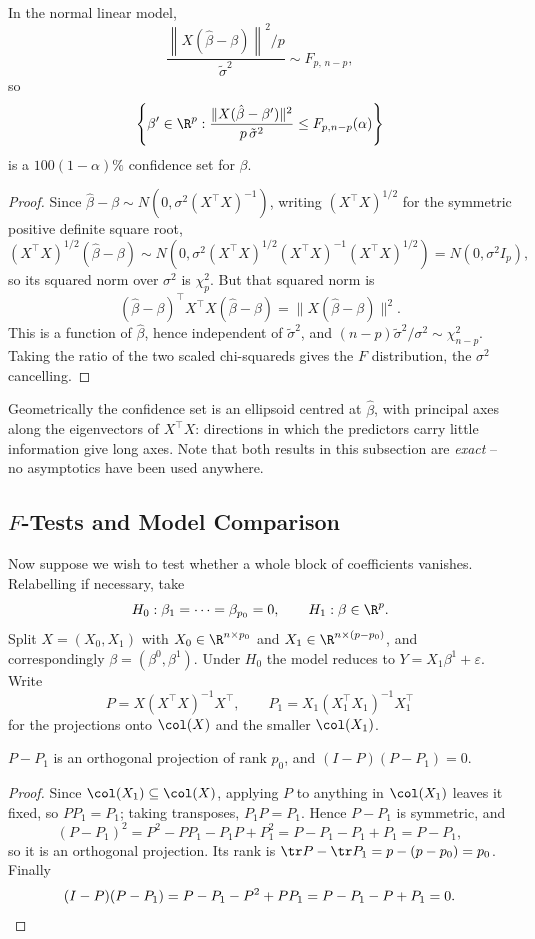 \begin{proposition}
  In the normal linear model,
  $$
  \frac{\left\|X(\hat\beta - \beta)\right\|^2/p}{\tilde\sigma^2}\sim F_{p,\,n-p},
  $$
  so
  $$
  \left\{\beta'\in\R^p : \frac{\|X(\hat\beta - \beta')\|^2}{p\,\tilde\sigma^2}\leq F_{p,n-p}(\alpha)\right\}
  $$
  is a $100(1-\alpha)\%$ confidence set for $\beta$.
\end{proposition}
\begin{proof}
  Since $\hat\beta - \beta\sim N(0,\sigma^2(X^\top X)^{-1})$, writing $(X^\top X)^{1/2}$ for the symmetric positive definite square root,
  $$
  (X^\top X)^{1/2}(\hat\beta - \beta)\sim N\left(0,\sigma^2(X^\top X)^{1/2}(X^\top X)^{-1}(X^\top X)^{1/2}\right) = N(0,\sigma^2 I_p),
  $$
  so its squared norm over $\sigma^2$ is $\chi^2_p$. But that squared norm is
  $$
  (\hat\beta-\beta)^\top X^\top X(\hat\beta-\beta) = \|X(\hat\beta-\beta)\|^2.
  $$
  This is a function of $\hat\beta$, hence independent of $\tilde\sigma^2$, and $(n-p)\tilde\sigma^2/\sigma^2\sim\chi^2_{n-p}$. Taking the ratio of the two scaled chi-squareds gives the $F$ distribution, the $\sigma^2$ cancelling.
\end{proof}

Geometrically the confidence set is an ellipsoid centred at $\hat\beta$, with principal axes along the eigenvectors of $X^\top X$: directions in which the predictors carry little information give long axes. Note that both results in this subsection are \emph{exact} -- no asymptotics have been used anywhere.

\subsection{\texorpdfstring{$F$}{F}-Tests and Model Comparison}

Now suppose we wish to test whether a whole block of coefficients vanishes. Relabelling if necessary, take
$$
H_0 : \beta_1 = \cdots = \beta_{p_0} = 0, \qquad H_1 : \beta\in\R^p.
$$
Split $X = (X_0, X_1)$ with $X_0\in\R^{n\times p_0}$ and $X_1 \in\R^{n\times(p-p_0)}$, and correspondingly $\beta = (\beta^0,\beta^1)$. Under $H_0$ the model reduces to $Y = X_1\beta^1+\varepsilon$. Write
$$
P = X(X^\top X)^{-1}X^\top, \qquad P_1 = X_1(X_1^\top X_1)^{-1}X_1^\top
$$
for the projections onto $\col(X)$ and the smaller $\col(X_1)$.

\begin{lemma}\label{lem:ppp}
  $P - P_1$ is an orthogonal projection of rank $p_0$, and $(I-P)(P-P_1) = 0$.
\end{lemma}
\begin{proof}
  Since $\col(X_1)\subseteq\col(X)$, applying $P$ to anything in $\col(X_1)$ leaves it fixed, so $PP_1 = P_1$; taking transposes, $P_1P = P_1$. Hence $P - P_1$ is symmetric, and
  $$
  (P-P_1)^2 = P^2 - PP_1 - P_1P + P_1^2 = P - P_1 - P_1 + P_1 = P - P_1,
  $$
  so it is an orthogonal projection. Its rank is $\tr P - \tr P_1 = p - (p-p_0) = p_0$. Finally
  $$
  (I-P)(P-P_1) = P - P_1 - P^2 + PP_1 = P - P_1 - P + P_1 = 0. \qedhere
  $$
\end{proof}

